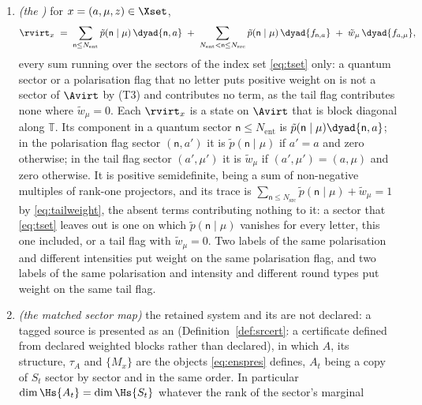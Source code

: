 \begin{definition}
\begin{enumerate}[label=(T\arabic*),leftmargin=3.0em]
$\Avirt$, and $\Pi^{\mathrm v}_t$ is the projector onto $S_t$. Every flag
sector is one dimensional, and so is the quantum sector $\mathsf{n}=0$. The
index set is a function of the declared weights.
\item \emph{(the )} for $x=(a,\mu,z)\in\Xset$,
\begin{equation}\label{eq:rvirt}
  \rvirt_x\;=\;
  \sum_{\mathsf{n}\le N_{\mathrm{ent}}}
    \tilde p(\mathsf{n}\mid\mu)\,\dyad{\mathsf{n},a}
  \;+\;
  \sum_{N_{\mathrm{ent}}<\mathsf{n}\le N_{\mathrm{src}}}
    \tilde p(\mathsf{n}\mid\mu)\,\dyad{f_{\mathsf{n},a}}
  \;+\;
  \tilde w_{\mu}\,\dyad{f_{a,\mu}} ,
\end{equation}
every sum running over the sectors of the index set \eqref{eq:tset} only: a
quantum sector or a polarisation flag that no letter puts positive weight on is
not a sector of $\Avirt$ by (T3) and contributes no term, as the tail flag
contributes none where $\tilde w_{\mu}=0$. Each $\rvirt_x$ is a state on
$\Avirt$ that is block diagonal along $\mathbb{T}$. Its component in a quantum
sector $\mathsf{n}\le N_{\mathrm{ent}}$ is
$\tilde p(\mathsf{n}\mid\mu)\dyad{\mathsf{n},a}$; in the polarisation flag
sector $(\mathsf{n},a')$ it is $\tilde p(\mathsf{n}\mid\mu)$ if $a'=a$ and zero
otherwise; in the tail flag sector $(a',\mu')$ it is $\tilde w_{\mu}$ if
$(a',\mu')=(a,\mu)$ and zero otherwise. It is positive semidefinite, being a
sum of non-negative multiples of rank-one projectors, and its trace is
$\sum_{\mathsf{n}\le N_{\mathrm{src}}}\tilde p(\mathsf{n}\mid\mu)
+\tilde w_{\mu}=1$ by \eqref{eq:tailweight}, the absent terms contributing
nothing to it: a sector that \eqref{eq:tset} leaves out is one on which
$\tilde p(\mathsf{n}\mid\mu)$ vanishes for every letter, this one included, or
a tail flag with $\tilde w_{\mu}=0$. Two labels of the same polarisation and
different intensities put weight on the same polarisation flag, and two labels
of the same polarisation and intensity and different round types put weight on
the same tail flag.
\item \emph{(the matched sector map)} the retained system and its
 are not declared: a tagged source is presented as an
 (Definition~\ref{def:srcert}: a certificate defined from declared
weighted blocks rather than declared), in which $A$, its structure, $\tau_A$
and $\{M_x\}$ are the objects \eqref{eq:enspres} defines, $A_t$ being a copy of
$S_t$ sector by sector and in the same order. In particular
$\dim\Hs{A_t}=\dim\Hs{S_t}$ whatever the rank of the sector's marginal

\end{enumerate}
\end{definition}
